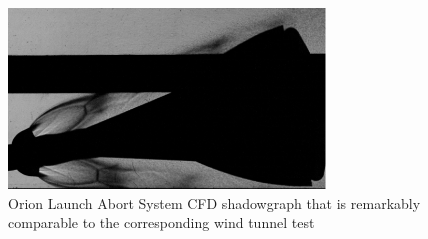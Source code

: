 \documentclass[]{aiaa-tc}%
\begin{document}
\begin{figure}[htb]
\begin{center}
\includegraphics[width=0.75\textwidth]{Images/LAS_CFD_Shadowgraph.png}
\caption{Orion Launch Abort System CFD shadowgraph that is remarkably comparable to the corresponding wind tunnel test \cite{OverflowOrionAbortGuidelines}}
\label{LASCFDshadowgraph}
\end{center}
\end{figure}
\end{document}
